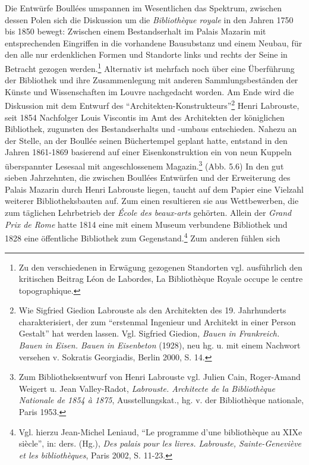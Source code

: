 Die Entwürfe Boullées umspannen im Wesentlichen das Spektrum, zwischen
dessen Polen sich die Diskussion um die \emph{Bibliothèque royale} in
den Jahren 1750 bis 1850 bewegt: Zwischen einem Bestandserhalt im Palais
Mazarin mit entsprechenden Eingriffen in die vorhandene Bausubstanz und
einem Neubau, für den alle nur erdenklichen Formen und Standorte links
und rechts der Seine in Betracht gezogen werden.\footnote{Zu den
  verschiedenen in Erwägung gezogenen Standorten vgl. ausführlich den
  kritischen Beitrag Léon de Labordes, La Bibliothèque Royale occupe le
  centre topographique.} Alternativ ist mehrfach noch über eine
Überführung der Bibliothek und ihre Zusammenlegung mit anderen
Sammlungsbeständen der Künste und Wissenschaften im Louvre nachgedacht
worden. Am Ende wird die Diskussion mit dem Entwurf des
\enquote{Architekten-Konstrukteurs}\footnote{Wie Sigfried Giedion
  Labrouste als den Architekten des 19. Jahrhunderts charakterisiert,
  der zum \enquote{erstenmal Ingenieur und Architekt in einer Person
  Gestalt} hat werden lassen. Vgl. Sigfried Giedion, \emph{Bauen in
  Frankreich. Bauen in Eisen. Bauen in Eisenbeton} (1928), neu hg. u.
  mit einem Nachwort versehen v. Sokratis Georgiadis, Berlin 2000, S.
  14.} Henri Labrouste, seit 1854 Nachfolger Louis Viscontis im Amt des
Architekten der königlichen Bibliothek, zugunsten des Bestandserhalts
und -umbaus entschieden. Nahezu an der Stelle, an der Boullée seinen
Büchertempel geplant hatte, entstand in den Jahren 1861-1869 basierend
auf einer Eisenkonstruktion ein von neun Kuppeln überspannter Lesesaal
mit angeschlossenem Magazin.\footnote{Zum Bibliotheksentwurf von Henri
  Labrouste vgl. Julien Cain, Roger-Amand Weigert u. Jean Valley-Radot,
  \emph{Labrouste. Architecte de la Bibliothèque Nationale de 1854 à
  1875}, Ausstellungskat., hg. v. der Bibliothèque nationale, Paris
  1953.} (Abb. 5.6) In den gut sieben Jahrzehnten, die zwischen Boullées
Entwürfen und der Erweiterung des Palais Mazarin durch Henri Labrouste
liegen, taucht auf dem Papier eine Vielzahl weiterer Bibliotheksbauten
auf. Zum einen resultieren sie aus Wettbewerben, die zum täglichen
Lehrbetrieb der \emph{École des beaux-arts} gehörten. Allein der
\emph{Grand Prix de Rome} hatte 1814 eine mit einem Museum verbundene
Bibliothek und 1828 eine öffentliche Bibliothek zum
Gegenstand.\footnote{Vgl. hierzu Jean-Michel Leniaud, \enquote{Le
  programme d'une bibliothèque au XIXe siècle}, in: ders. (Hg.),
  \emph{Des palais pour les livres. Labrouste, Sainte-Geneviève et les
  bibliothèques}, Paris 2002, S. 11-23.} Zum anderen fühlen sich

